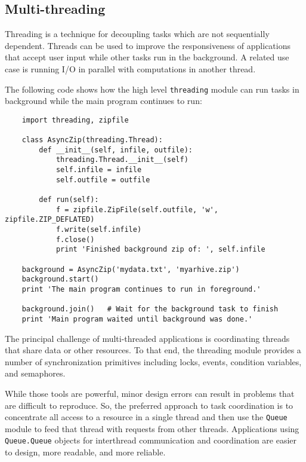 \documentclass[UTF8]{article}
\begin{document}
\subsection{Multi-threading}
Threading is a technique for decoupling tasks which are not sequentially dependent. Threads can be
used to improve the responsiveness of applications that accept user input while other tasks run in
the background. A related use case is running I/O in parallel with computations in another thread.

The following code shows how the high level \texttt{threading} module can run tasks in background
while the main program continues to run:
\begin{verbatim}
    import threading, zipfile

    class AsyncZip(threading.Thread):
        def __init__(self, infile, outfile):
            threading.Thread.__init__(self)
            self.infile = infile
            self.outfile = outfile

        def run(self):
            f = zipfile.ZipFile(self.outfile, 'w', zipfile.ZIP_DEFLATED)
            f.write(self.infile)
            f.close()
            print 'Finished background zip of: ', self.infile

    background = AsyncZip('mydata.txt', 'myarhive.zip')
    background.start()
    print 'The main program continues to run in foreground.'

    background.join()   # Wait for the background task to finish
    print 'Main program waited until background was done.'
\end{verbatim}

The principal challenge of multi-threaded applications is coordinating threads that share data or
other resources. To that end, the threading module provides a number of synchronization primitives
including locks, events, condition variables, and semaphores.

While those tools are powerful, minor design errors can result in problems that are difficult to
reproduce. So, the preferred approach to task coordination is to concentrate all access to a
resource in a single thread and then use the \texttt{Queue} module to feed that thread with
requests from other threads. Applications using \texttt{Queue.Queue} objects for interthread
communication and coordination are easier to design, more readable, and more reliable.
\end{document}
